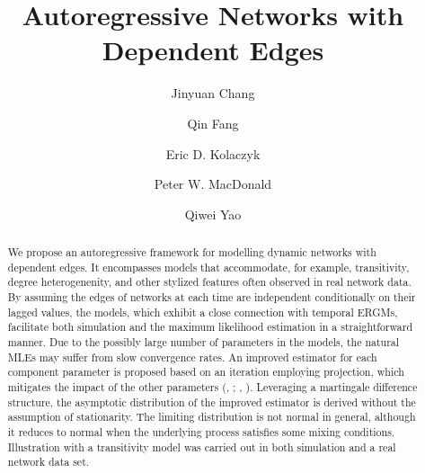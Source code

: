 \documentclass[12pt]{article}
\newcommand{\0}{{\bf 0}}
\begin{document}
\title{\bf \Large Autoregressive Networks with Dependent Edges}

\author[1,2]{\small Jinyuan Chang}
\author[3]{\small Qin Fang}
\author[4,*]{\small Eric D. Kolaczyk}
\author[5]{\small Peter W. MacDonald}
\author[6]{\small Qiwei Yao}
\setcounter{Maxaffil}{0}
\renewcommand\Affilfont{\itshape\small}
\date{}
\maketitle
\vspace{-1cm}

\begin{abstract}
We propose an autoregressive framework for modelling dynamic networks with dependent edges. It encompasses models that accommodate, for example, transitivity, degree heterogenenity, and other stylized features often observed in real network data. By assuming the edges of networks at each time are independent conditionally on their lagged values, the models, which exhibit a close connection with temporal ERGMs, facilitate both simulation and the maximum likelihood estimation in a straightforward manner. Due to the possibly large number of parameters in the models, the natural MLEs may suffer from slow convergence rates. An improved estimator for each component parameter is proposed based on an iteration employing projection, which mitigates the impact of the other parameters (\citeauthor{ChangChenTangWu2021}, \citeyear{ChangChenTangWu2021}; \citeauthor{ChangShiZhang2023}, \citeyear{ChangShiZhang2023}).
Leveraging a martingale difference structure, the asymptotic distribution of the improved estimator is derived without the assumption of stationarity. The limiting distribution is not normal in general, although it reduces to normal when the underlying process satisfies some mixing conditions. Illustration with a transitivity model was carried out in both simulation and a real network data set.
\end{abstract}
\end{document}
